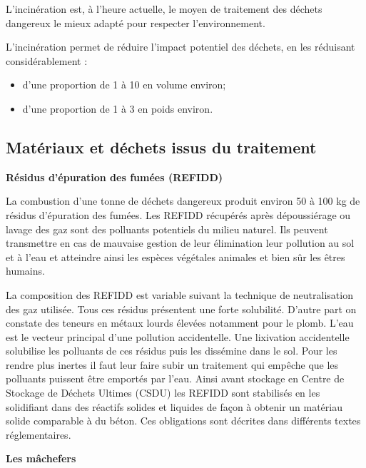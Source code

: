 L’incinération est, à l’heure actuelle, le moyen de traitement des déchets dangereux le mieux adapté pour respecter l’environnement.
 
L’incinération permet de réduire l’impact potentiel des déchets, en les réduisant considérablement :

 \begin{itemize}
\item d’une proportion de 1 à 10 en volume environ;
\item  d’une proportion de 1 à 3 en poids environ.

 \end{itemize}

\subsection{Matériaux et déchets issus du traitement} 

\vspace{0.3cm}
\textbf{Résidus d'épuration des fumées (REFIDD)}
\vspace{0.3cm}

La combustion d’une tonne de déchets dangereux produit environ 50 à 100 kg de résidus d’épuration des fumées. Les REFIDD récupérés après dépoussiérage ou lavage des gaz sont des polluants potentiels du milieu naturel. Ils peuvent transmettre en cas de mauvaise gestion de leur élimination leur pollution au sol et à l’eau et atteindre ainsi les espèces végétales animales et bien sûr les êtres humains.

La composition des REFIDD est variable suivant la technique de neutralisation des gaz utilisée. Tous ces résidus présentent une forte solubilité. D’autre part on constate des teneurs en métaux lourds élevées notamment pour le plomb.
L’eau est le vecteur principal d’une pollution accidentelle. Une lixivation accidentelle solubilise les polluants de ces résidus puis les dissémine dans le sol. Pour les rendre plus inertes il faut leur faire subir un traitement qui empêche que les polluants puissent être emportés par l’eau. Ainsi avant stockage en Centre de Stockage de Déchets Ultimes (CSDU) les REFIDD sont stabilisés en les solidifiant dans des réactifs solides et liquides de façon à obtenir un matériau solide comparable à du béton. Ces obligations sont décrites dans différents textes réglementaires.


\vspace{0.3cm}
\textbf{Les mâchefers}
\vspace{0.3cm}

